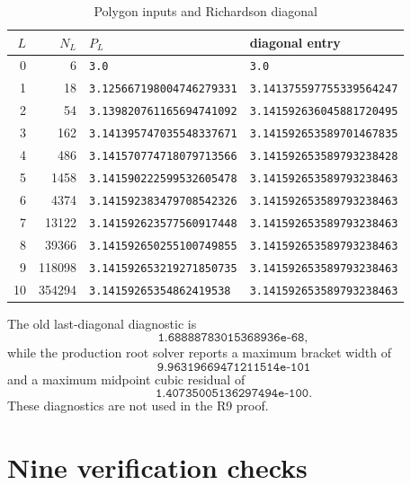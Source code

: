 \documentclass[11pt]{article}
\begin{document}
\begin{table}[ht]
\centering
\small
\caption{Polygon inputs and Richardson diagonal}
\begin{tabular}{r r l l}
\toprule
$L$ & $N_L$ & $P_L$ & diagonal entry \\
\midrule
0 & 6 & \texttt{3.0} & \texttt{3.0} \\
1 & 18 & \texttt{3.125667198004746279331} & \texttt{3.141375597755339564247} \\
2 & 54 & \texttt{3.139820761165694741092} & \texttt{3.141592636045881720495} \\
3 & 162 & \texttt{3.141395747035548337671} & \texttt{3.141592653589701467835} \\
4 & 486 & \texttt{3.141570774718079713566} & \texttt{3.141592653589793238428} \\
5 & 1458 & \texttt{3.141590222599532605478} & \texttt{3.141592653589793238463} \\
6 & 4374 & \texttt{3.141592383479708542326} & \texttt{3.141592653589793238463} \\
7 & 13122 & \texttt{3.141592623577560917448} & \texttt{3.141592653589793238463} \\
8 & 39366 & \texttt{3.141592650255100749855} & \texttt{3.141592653589793238463} \\
9 & 118098 & \texttt{3.141592653219271850735} & \texttt{3.141592653589793238463} \\
10 & 354294 & \texttt{3.14159265354862419538} & \texttt{3.141592653589793238463} \\
\bottomrule
\end{tabular}
\end{table}

The old last-diagonal diagnostic is
\[
 \texttt{1.68888783015368936e-68},
\]
while the production root solver reports a maximum bracket width of
\[
 \texttt{9.96319669471211514e-101}
\]
and a maximum midpoint cubic residual of
\[
 \texttt{1.40735005136297494e-100}.
\]
These diagnostics are not used in the R9 proof.

\section{Nine verification checks}
\end{document}
